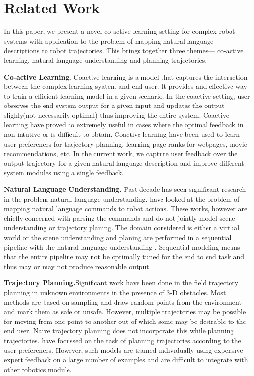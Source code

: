 \section{Related Work}
In this paper, we present a novel co-active learning setting for complex robot systems with application to the problem of mapping natural language descriptions to robot trajectories. This brings together three themes--- co-active learning, natural language understanding and planning trajectories.

\noindent\textbf{Co-active Learning.}
Coactive learning is a model that captures the interaction between the complex learning syatem and end user. It provides and effective way to train a efficient learning model in a given scenario. In the coactive setting, user observes the end system output for a given input and updates the output slighly(not necessarily optimal) thus improving the entire system. Coactive learning have proved to extremely useful in cases where the optimal feedback in non intutive or is difficult to obtain. Coactive learning have been used to learn user preferences for trajectory planning, learning page ranks for webpages, movie recommendations, etc. In the current work, we capture user feedback over the output trajectory for a given natural language description and improve different system modules using a single feedback. 

\noindent\textbf{Natural Language Understanding.} Past decade has seen significant research in the problem natural language understanding. \cite{tellex2011understanding,fasola2013using,misra2014tell,chen2010training,artzi2013weakly,matuszek2012grounded, Mei2015Navigational,branavan2012learning} have looked at the problem of mapping natural language commands to robot actions. These works, however are chiefly concerned with parsing the commands and do not jointly model scene understanding or trajectory planing. The domain considered is either a virtual world \cite{chen2010training,artzi2013weakly,matuszek2012grounded, Mei2015Navigational,branavan2012learning} or the scene understanding and planing are performed in a sequential pipeline with the natural language understanding \cite{tellex2011understanding,misra2014tell}. Sequential modeling means that the entire pipeline may not be optimally tuned for the end to end task and thus may or may not produce reasonable output. 

\noindent\textbf{Trajectory Planning.}Significant work have been done in the field trajectory planning in unknown environments in the presence of 3-D obstacles. Most methods are based on sampling and draw random points from the environment and mark them as safe or unsafe. However, multiple trajectories may be possible for moving from one point to another out of which some may be desirable to the end user. Naive trajectory planning does not incorporate this while planning trajectories. \cite{planit,nipscoactiveplanning} have focussed on the task of planning trajectories according to the user preferences. However, such models are trained individually using expensive expert feedback on a large number of examples and are difficult to integrate with other robotics module.

\vspace{3.6em}
\iffalse
The TellMeDave system translates natural language sentences to actions
sequences. PlanIt systems evaluates planning trajectories based on human
context. We have combined the systems resulting in an end-to-end system which
uses RoboBrain for features running on Weaver. 
\fi
